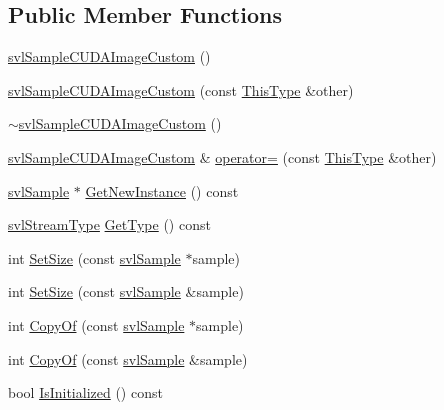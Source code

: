 \subsection*{Public Member Functions}
\begin{DoxyCompactItemize}
\item 
\hyperlink{classsvl_sample_c_u_d_a_image_custom_a53500b9b88f656f890789c600953f2f4}{svl\+Sample\+C\+U\+D\+A\+Image\+Custom} ()
\item 
\hyperlink{classsvl_sample_c_u_d_a_image_custom_aef24b0920d513ab377df35e72333f694}{svl\+Sample\+C\+U\+D\+A\+Image\+Custom} (const \hyperlink{classsvl_sample_c_u_d_a_image_custom}{This\+Type} \&other)
\item 
\hyperlink{classsvl_sample_c_u_d_a_image_custom_a866c47618c6763fc7e8a46c8bedff607}{$\sim$svl\+Sample\+C\+U\+D\+A\+Image\+Custom} ()
\item 
\hyperlink{classsvl_sample_c_u_d_a_image_custom}{svl\+Sample\+C\+U\+D\+A\+Image\+Custom} \& \hyperlink{classsvl_sample_c_u_d_a_image_custom_a7af0e47ca3433ab37893354ff0e6c310}{operator=} (const \hyperlink{classsvl_sample_c_u_d_a_image_custom}{This\+Type} \&other)
\item 
\hyperlink{classsvl_sample}{svl\+Sample} $\ast$ \hyperlink{classsvl_sample_c_u_d_a_image_custom_a8978ea89a71df5b4b23dc0b0f6f0b233}{Get\+New\+Instance} () const 
\item 
\hyperlink{svl_definitions_8h_aa00696d338a58db361335a01fd11e122}{svl\+Stream\+Type} \hyperlink{classsvl_sample_c_u_d_a_image_custom_a8a69cb31980239dd0063aa21a742f4c7}{Get\+Type} () const 
\item 
int \hyperlink{classsvl_sample_c_u_d_a_image_custom_a89befc3335ed2ddef86b4435bb357ca9}{Set\+Size} (const \hyperlink{classsvl_sample}{svl\+Sample} $\ast$sample)
\item 
int \hyperlink{classsvl_sample_c_u_d_a_image_custom_af233c4d9493dab2a10c307212e565802}{Set\+Size} (const \hyperlink{classsvl_sample}{svl\+Sample} \&sample)
\item 
int \hyperlink{classsvl_sample_c_u_d_a_image_custom_acb3ccb03ab61127574e7dd76f3fa1574}{Copy\+Of} (const \hyperlink{classsvl_sample}{svl\+Sample} $\ast$sample)
\item 
int \hyperlink{classsvl_sample_c_u_d_a_image_custom_a686a74b9f5215dbb14d6e8ad8e890308}{Copy\+Of} (const \hyperlink{classsvl_sample}{svl\+Sample} \&sample)
\item 
bool \hyperlink{classsvl_sample_c_u_d_a_image_custom_af7617f8ba9cd4079f2f630ab6024c81e}{Is\+Initialized} () const 
\item 

\end{DoxyCompactItemize}
